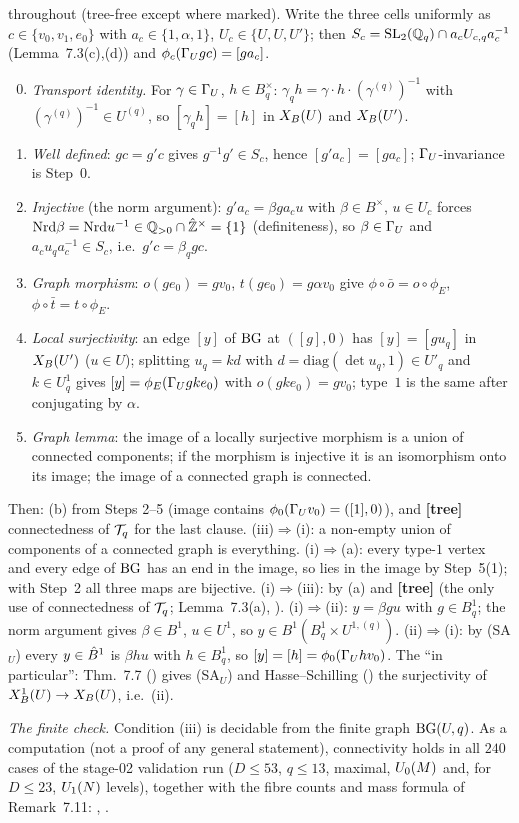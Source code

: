 \begin{outline}
\stproved{} throughout (tree-free except where marked). Write the three cells uniformly as $c\in\{v_0,v_1,e_0\}$ with
$a_c\in\{1,\alpha,1\}$, $U_c\in\{U,U,U'\}$; then $S_c=\mathrm{SL}_2(\mathbb{Q}_q)\cap a_cU_{c,q}a_c^{-1}$ (Lemma~7.3(c),(d)) and $\phi_c(\Gamma_U gc)=[ga_c]$.
\begin{enumerate}
\setcounter{enumi}{-1}
\item \emph{Transport identity.} For $\gamma\in\Gamma_U$, $h\in B_q^\times$: $\gamma_qh=\gamma\cdot h\cdot(\gamma^{(q)})^{-1}$ with
$(\gamma^{(q)})^{-1}\in U^{(q)}$, so $[\gamma_qh]=[h]$ in $X_B(U)$ and $X_B(U')$.
\item \emph{Well defined}: $gc=g'c$ gives $g^{-1}g'\in S_c$, hence $[g'a_c]=[ga_c]$; $\Gamma_U$-invariance is Step~0.
\item \emph{Injective} (the norm argument): $g'a_c=\beta ga_cu$ with $\beta\in B^\times$, $u\in U_c$ forces
$\mathrm{Nrd}\beta=\mathrm{Nrd} u^{-1}\in\mathbb{Q}_{>0}\cap\hat{\mathbb{Z}}^\times=\{1\}$ (definiteness), so $\beta\in\Gamma_U$ and $a_cu_qa_c^{-1}\in S_c$, i.e.\ $g'c=\beta_qgc$.
\item \emph{Graph morphism}: $o(ge_0)=gv_0$, $t(ge_0)=g\alpha v_0$ give $\phi\circ\bar o=o\circ\phi_E$, $\phi\circ\bar t=t\circ\phi_E$.
\item \emph{Local surjectivity}: an edge $[y]$ of $\mathrm{BG}$ at $([g],0)$ has $[y]=[gu_q]$ in $X_B(U')$ ($u\in U$); splitting
$u_q=kd$ with $d=\mathrm{diag}(\det u_q,1)\in U'_q$ and $k\in U^1_q$ gives $[y]=\phi_E(\Gamma_U gke_0)$ with $o(gke_0)=gv_0$; type~$1$ is
the same after conjugating by $\alpha$.
\item \emph{Graph lemma}: the image of a locally surjective morphism is a union of connected components; if the morphism is
injective it is an isomorphism onto its image; the image of a connected graph is connected.
\end{enumerate}
Then: (b) from Steps 2--5 (image contains $\phi_0(\Gamma_U v_0)=([1],0)$), and \textbf{[tree]} connectedness of $\mathcal{T}_q$ for the last
clause. (iii)$\Rightarrow$(i): a non-empty union of components of a connected graph is everything. (i)$\Rightarrow$(a): every
type-$1$ vertex and every edge of $\mathrm{BG}$ has an end in the image, so lies in the image by Step~5(1); with Step~2 all three maps are
bijective. (i)$\Rightarrow$(iii): by (a) and \textbf{[tree]} (the only use of connectedness of $\mathcal{T}_q$; Lemma~7.3(a), \stcited).
(i)$\Rightarrow$(ii): $y=\beta gu$ with $g\in B^1_q$; the norm argument gives $\beta\in B^1$, $u\in U^1$, so $y\in B^1(B^1_q\times U^{1,(q)})$.
(ii)$\Rightarrow$(i): by (SA$_U$) every $y\in\hat{B}^1$ is $\beta hu$ with $h\in B^1_q$, so $[y]=[h]=\phi_0(\Gamma_U hv_0)$. The ``in particular'':
Thm.~7.7 (\stcited) gives (SA$_U$) and Hasse--Schilling (\stcited) the surjectivity of $X^1_B(U)\to X_B(U)$, i.e.\ (ii).

\emph{The finite check.} Condition (iii) is decidable from the finite graph $\mathrm{BG}(U,q)$. As a computation (not a proof of any
general statement), connectivity holds in all $240$ cases of the stage-02 validation run ($D\le53$, $q\le13$, maximal,
$U_0(M)$ and, for $D\le23$, $U_1(N)$ levels), together with the fibre counts and mass formula of Remark~7.11: \stcomp,
.
\end{outline}

